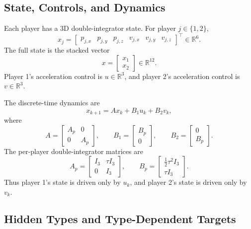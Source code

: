 \documentclass[11pt]{article}
\newcommand{\R}{\mathbb{R}}
\begin{document}
\subsection{State, Controls, and Dynamics}

Each player has a 3D double-integrator state.  For player $j \in \{1,2\}$,
\[
    x_j =
    \begin{bmatrix}
        p_{j,x} & p_{j,y} & p_{j,z} &
        v_{j,x} & v_{j,y} & v_{j,z}
    \end{bmatrix}^{\!\top}
    \in \R^6.
\]
The full state is the stacked vector
\[
    x =
    \begin{bmatrix}
        x_1 \\ x_2
    \end{bmatrix}
    \in \R^{12}.
\]
Player 1's acceleration control is $u \in \R^3$, and player 2's acceleration
control is $v \in \R^3$.

The discrete-time dynamics are
\[
    x_{k+1} = A x_k + B_1 u_k + B_2 v_k,
\]
where
\[
    A =
    \begin{bmatrix}
        A_p & 0 \\
        0 & A_p
    \end{bmatrix},
    \qquad
    B_1 =
    \begin{bmatrix}
        B_p \\ 0
    \end{bmatrix},
    \qquad
    B_2 =
    \begin{bmatrix}
        0 \\ B_p
    \end{bmatrix}.
\]
The per-player double-integrator matrices are
\[
    A_p =
    \begin{bmatrix}
        I_3 & \tau I_3 \\
        0 & I_3
    \end{bmatrix},
    \qquad
    B_p =
    \begin{bmatrix}
        \frac{1}{2}\tau^2 I_3 \\
        \tau I_3
    \end{bmatrix}.
\]
Thus player 1's state is driven only by $u_k$, and player 2's state is driven
only by $v_k$.

\subsection{Hidden Types and Type-Dependent Targets}
\end{document}
